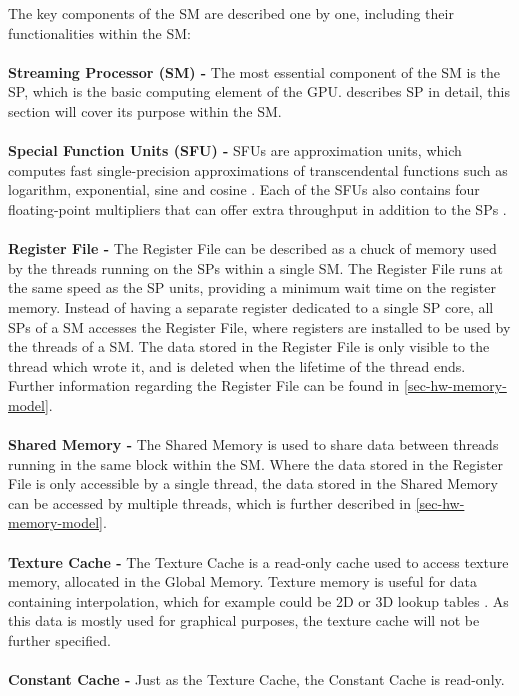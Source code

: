 The key components of the SM are described one by one, including their functionalities within the SM:
\\\\
\textbf{Streaming Processor (SM) -}  The most essential component of the SM is the SP, which is the basic computing element of the GPU.
 describes SP in detail, this section will cover its purpose within the SM.
\\\\	
\textbf{Special Function Units (SFU) -} SFUs are approximation units, which computes fast single-precision approximations of transcendental functions such as logarithm, exponential, sine and cosine \cite{Wilt2013}.
Each of the SFUs also contains four floating-point multipliers that can offer extra throughput in addition to the SPs \cite{Li2016}.
\\\\	
\textbf{Register File -} The Register File can be described as a chuck of memory used by the threads running on the SPs within a single SM. 
The Register File runs at the same speed as the SP units, providing a minimum wait time on the register memory. 
Instead of having a separate register dedicated to a single SP core, all SPs of a SM accesses the Register File, where registers are installed to be used by the threads of a SM.
The data stored in the Register File is only visible to the thread which wrote it, and is deleted when the lifetime of the thread ends.
Further information regarding the Register File can be found in \cref{sec-hw-memory-model}.
\\\\	
\textbf{Shared Memory -} The Shared Memory is used to share data between threads running in the same block within the SM.
Where the data stored in the Register File is only accessible by a single thread, the data stored in the Shared Memory can be accessed by multiple threads, which is further described in \cref{sec-hw-memory-model}.
\\\\		
\textbf{Texture Cache -} The Texture Cache is a read-only cache used to access texture memory, allocated in the Global Memory.
Texture memory is useful for data containing interpolation, which for example could be 2D or 3D lookup tables \cite{Cook2008}.
As this data is mostly used for graphical purposes, the texture cache will not be further specified.
\\\\	
\textbf{Constant Cache -} Just as the Texture Cache, the Constant Cache is read-only.
